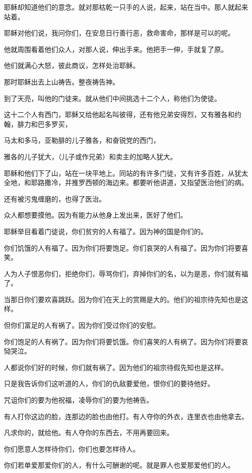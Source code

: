 \documentclass[12pt,oneside]{book}
\begin{document}
耶稣却知道他们的意念。就对那枯乾一只手的人说，起来，站在当中。那人就起来站着。

耶稣对他们说，我问你们，在安息日行善行恶，救命害命，那样是可以的呢。

他就周围看着他们众人，对那人说，伸出手来。他把手一伸，手就复了原。

他们就满心大怒，彼此商议，怎样处治耶稣。

那时耶稣出去上山祷告。整夜祷告神。

到了天亮，叫他的门徒来。就从他们中间挑选十二个人，称他们为使徒。

这十二个人有西门，耶稣又给他起名叫彼得，还有他兄弟安得烈，又有雅各和约翰，腓力和巴多罗买，

马太和多马，亚勒腓的儿子雅各，和奋锐党的西门，

雅各的儿子犹大，（儿子或作兄弟）和卖主的加略人犹大。

耶稣和他们下了山，站在一块平地上。同站的有许多门徒，又有许多百姓，从犹太全地，和耶路撒冷，并推罗西顿的海边来。都要听他讲道，又指望医治他们的病。

还有被污鬼缠磨的，也得了医治。

众人都想要摸他。因为有能力从他身上发出来，医好了他们。

耶稣举目看着门徒说，你们贫穷的人有福了。因为神的国是你们的。

你们饥饿的人有福了。因为你们将要饱足。你们哀哭的人有福了。因为你们将要喜笑。

人为人子恨恶你们，拒绝你们，辱骂你们，弃掉你们的名，以为是恶，你们就有福了。

当那日你们要欢喜跳跃。因为你们在天上的赏赐是大的。他们的祖宗待先知也是这样。

但你们富足的人有祸了。因为你们受过你们的安慰。

你们饱足的人有祸了。因为你们将要饥饿。你们喜笑的人有祸了。因为你们将要哀恸哭泣。

人都说你们好的时候，你们就有祸了。因为他们的祖宗待假先知也是这样。

只是我告诉你们这听道的人，你们的仇敌要爱他，恨你们的要待他好。

咒诅你们的要为他祝福，凌辱你们的要为他祷告。

有人打你这边的脸，连那边的脸也由他打。有人夺你的外衣，连里衣也由他拿去。

凡求你的，就给他。有人夺你的东西去，不用再要回来。

你们愿意人怎样待你们，你们也要怎样待人。

你们若单爱那爱你们的人，有什么可酬谢的呢。就是罪人也爱那爱他们的人。
\end{document}

